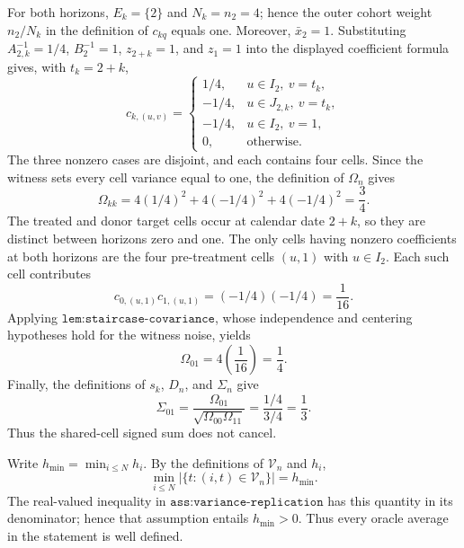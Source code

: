 For both horizons, \(E_k=\{2\}\) and \(N_k=n_2=4\); hence the outer
cohort weight \(n_2/N_k\) in the definition of \(c_{kq}\) equals one.
Moreover, \(\bar x_2=1\).  Substituting
\(A_{2,k}^{-1}=1/4\), \(B_2^{-1}=1\), \(z_{2+k}=1\), and \(z_1=1\)
into the displayed coefficient formula gives, with \(t_k=2+k\),
\[
 c_{k,(u,v)}=
 \begin{cases}
  1/4,&u\in I_2,\ v=t_k,\\
 -1/4,&u\in J_{2,k},\ v=t_k,\\
 -1/4,&u\in I_2,\ v=1,\\
 0,&\text{otherwise}.
 \end{cases}
\]
The three nonzero cases are disjoint, and each contains four cells.  Since
the witness sets every cell variance equal to one, the definition of
\(\Omega_n\) gives
\[
 \Omega_{kk}
 =4(1/4)^2+4(-1/4)^2+4(-1/4)^2
 =\frac34.
\]
The treated and donor target cells occur at calendar date \(2+k\), so they
are distinct between horizons zero and one.  The only cells having nonzero
coefficients at both horizons are the four pre-treatment cells \((u,1)\)
with \(u\in I_2\).  Each such cell contributes
\[
 c_{0,(u,1)}c_{1,(u,1)}=(-1/4)(-1/4)=\frac1{16}.
\]
Applying \(\texttt{lem:staircase-covariance}\), whose independence and
centering hypotheses hold for the witness noise, yields
\[
 \Omega_{01}=4\left(\frac1{16}\right)=\frac14.
\]
Finally, the definitions of \(s_k\), \(D_n\), and \(\Sigma_n\) give
\[
 \Sigma_{01}
 =\frac{\Omega_{01}}{\sqrt{\Omega_{00}\Omega_{11}}}
 =\frac{1/4}{3/4}=\frac13.
\]
Thus the shared-cell signed sum does not cancel.

Write \(h_{\min}=\min_{i\le N}h_i\).  By the definitions of
\(\mathcal V_n\) and \(h_i\),
\[
 \min_{i\le N}|\{t:(i,t)\in\mathcal V_n\}|=h_{\min}.
\]
The real-valued inequality in \(\texttt{ass:variance-replication}\) has
this quantity in its denominator; hence that assumption entails
\(h_{\min}>0\).  Thus every oracle average in the statement is well
defined.

